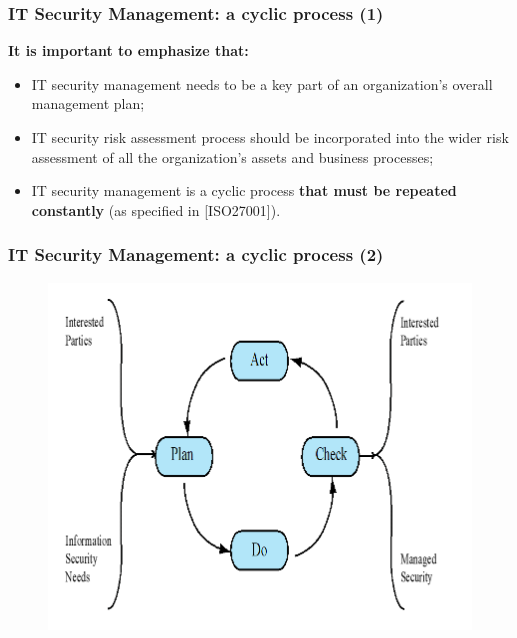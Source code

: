 \documentclass[xcolor ={table,usenames,dvipsnames}]{beamer}
\theoremstyle{definition}
\begin{document}
	\begin{frame}
		\frametitle{IT Security Management: a cyclic process (1)}
	    \textbf{It is important to emphasize that:}
	    \begin{itemize}
	    	\item IT security management needs to be a key part of an organization’s overall management plan;
	    	\item IT security risk assessment process should be incorporated into the
	    	wider risk assessment of all the organization’s assets and business processes;
	    	\item IT security management is a cyclic process \textbf{that must be repeated constantly} (as specified in [ISO27001]).
	    \end{itemize} 
	\end{frame}
	
	\begin{frame}
		\frametitle{IT Security Management: a cyclic process (2)}
			\begin{figure}[h!]
			\centering
			\includegraphics[scale=0.50]{img/img_02.PNG}
			\label{Interfacce di un CS}
		\end{figure}
	\end{frame}
	
	
\end{document}
